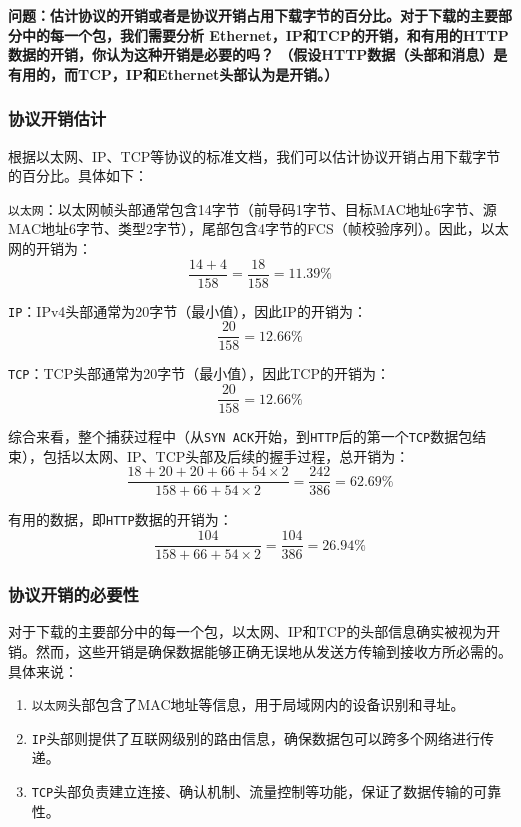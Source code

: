 \documentclass{article}
\begin{document}
\textbf{问题：估计协议的开销或者是协议开销占用下载字节的百分比。对于下载的主要部分中的每一个包，我们需要分析 Ethernet，IP和TCP的开销，和有用的HTTP数据的开销，你认为这种开销是必要的吗？ （假设HTTP数据（头部和消息）是有用的，而TCP，IP和Ethernet头部认为是开销。）}

\subsubsection{协议开销估计}

根据以太网、IP、TCP等协议的标准文档，我们可以估计协议开销占用下载字节的百分比。具体如下：

\texttt{以太网}：以太网帧头部通常包含14字节（前导码1字节、目标MAC地址6字节、源MAC地址6字节、类型2字节），尾部包含4字节的FCS（帧校验序列）。因此，以太网的开销为：
$$
\frac{14 + 4}{158} = \frac{18}{158} = 11.39\%
$$

\texttt{IP}：IPv4头部通常为20字节（最小值），因此IP的开销为：
$$
\frac{20}{158} = 12.66\%
$$

\texttt{TCP}：TCP头部通常为20字节（最小值），因此TCP的开销为：
$$
\frac{20}{158} = 12.66\%
$$

综合来看，整个捕获过程中（从\texttt{SYN ACK}开始，到\texttt{HTTP}后的第一个\texttt{TCP}数据包结束），包括以太网、IP、TCP头部及后续的握手过程，总开销为：
$$
\frac{18 + 20 + 20 + 66 + 54 \times 2}{158 + 66 + 54 \times 2} = \frac{242}{386} = 62.69\%
$$

有用的数据，即\texttt{HTTP}数据的开销为：
$$
\frac{104}{158 + 66 + 54 \times 2} = \frac{104}{386} = 26.94\%
$$

\subsubsection{协议开销的必要性}

对于下载的主要部分中的每一个包，以太网、IP和TCP的头部信息确实被视为开销。然而，这些开销是确保数据能够正确无误地从发送方传输到接收方所必需的。具体来说：

\begin{enumerate}[noitemsep, label={{\arabic*})}]
	\item \texttt{以太网}头部包含了MAC地址等信息，用于局域网内的设备识别和寻址。
	\item \texttt{IP}头部则提供了互联网级别的路由信息，确保数据包可以跨多个网络进行传递。
	\item \texttt{TCP}头部负责建立连接、确认机制、流量控制等功能，保证了数据传输的可靠性。
\end{enumerate}
\end{document}
